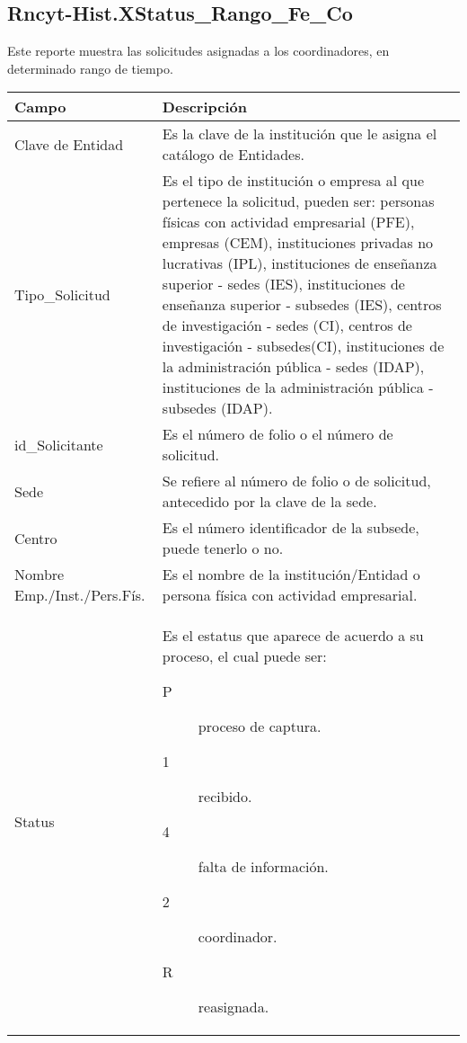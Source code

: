 \newpage
\subsection{Rncyt-Hist.XStatus\_Rango\_Fe\_Co}
\label{appendix:Reportes:PeopleSoft:RncytHistStatusRangoFeCo}

Este reporte muestra las solicitudes asignadas a los coordinadores, en determinado rango de tiempo.\\

\begin{tabular}{ m{} m{}  }%
	\rowcolor{gray1} {\bf Campo} &  {\bf Descripción} \\ \hline \hline

	Clave de Entidad & Es la clave de la institución que le asigna el catálogo de Entidades.\\
	\rowcolor{gray1}Tipo\_Solicitud & Es el tipo de institución o empresa al que pertenece la solicitud, pueden ser: personas físicas con actividad empresarial (PFE), empresas (CEM), instituciones privadas no lucrativas (IPL), instituciones de enseñanza superior - sedes (IES), instituciones de enseñanza superior - subsedes (IES), centros de investigación - sedes (CI), centros de investigación - subsedes(CI), instituciones de la administración pública - sedes (IDAP), instituciones de la administración pública - subsedes (IDAP).\\
	id\_Solicitante & Es el número de folio o el número de solicitud.\\
	\rowcolor{gray1}Sede & Se refiere al número de folio o de solicitud, antecedido por la clave de la sede.\\
	Centro & Es el número identificador de la subsede, puede tenerlo o no.\\
	\rowcolor{gray1}Nombre Emp./Inst./Pers.Fís. & Es el nombre de la institución/Entidad o persona física con actividad empresarial.\\
	Status & Es el estatus que aparece de acuerdo a su proceso, el cual puede ser:
               \begin{description}
                    \item[P] proceso de captura.
                    \item[1] recibido.
                    \item[4] falta de información.
                    \item[2] coordinador.
                    \item[R] reasignada.

\end{description}
\end{tabular}
